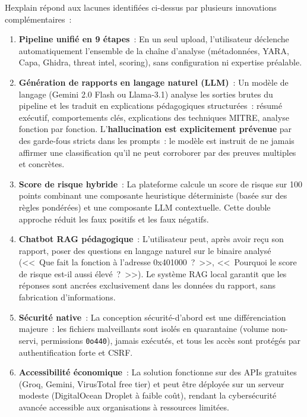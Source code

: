 Hexplain répond aux lacunes identifiées ci-dessus par plusieurs innovations complémentaires~:

\begin{enumerate}
  \item \textbf{Pipeline unifié en 9 étapes}~: En un seul upload, l'utilisateur déclenche automatiquement l'ensemble de la chaîne d'analyse (métadonnées, YARA, Capa, Ghidra, threat intel, scoring), sans configuration ni expertise préalable.

  \item \textbf{Génération de rapports en langage naturel (LLM)}~: Un modèle de langage (Gemini 2.0 Flash ou Llama-3.1) analyse les sorties brutes du pipeline et les traduit en explications pédagogiques structurées~: résumé exécutif, comportements clés, explications des techniques MITRE, analyse fonction par fonction. L'\textbf{hallucination est explicitement prévenue} par des garde-fous stricts dans les prompts~: le modèle est instruit de ne jamais affirmer une classification qu'il ne peut corroborer par des preuves multiples et concrètes.

  \item \textbf{Score de risque hybride}~: La plateforme calcule un score de risque sur 100 points combinant une composante heuristique déterministe (basée sur des règles pondérées) et une composante LLM contextuelle. Cette double approche réduit les faux positifs et les faux négatifs.

  \item \textbf{Chatbot RAG pédagogique}~: L'utilisateur peut, après avoir reçu son rapport, poser des questions en langage naturel sur le binaire analysé (<<~Que fait la fonction à l'adresse 0x401000~?~>>, <<~Pourquoi le score de risque est-il aussi élevé~?~>>). Le système RAG local garantit que les réponses sont ancrées exclusivement dans les données du rapport, sans fabrication d'informations.

  \item \textbf{Sécurité native}~: La conception sécurité-d'abord est une différenciation majeure~: les fichiers malveillants sont isolés en quarantaine (volume non-servi, permissions \texttt{0o440}), jamais exécutés, et tous les accès sont protégés par authentification forte et CSRF.

  \item \textbf{Accessibilité économique}~: La solution fonctionne sur des APIs gratuites (Groq, Gemini, VirusTotal free tier) et peut être déployée sur un serveur modeste (DigitalOcean Droplet à faible coût), rendant la cybersécurité avancée accessible aux organisations à ressources limitées.
\end{enumerate}

